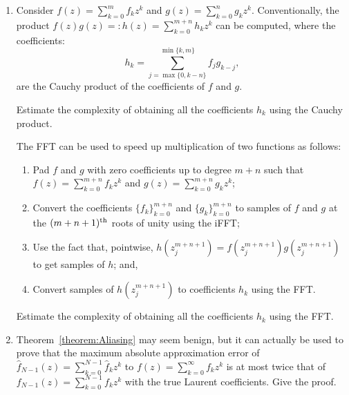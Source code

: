 \begin{enumerate}

\item Consider $\displaystyle f(z) = \sum_{k=0}^m f_k z^k$ and $\displaystyle g(z) = \sum_{k=0}^n g_k z^k$. Conventionally, the product $\displaystyle f(z)g(z) =: h(z) = \sum_{k=0}^{m+n}h_k z^k$ can be computed, where the coefficients:
\[
h_k=\sum_{j=\max\{0,k-n\}}^{\min\{k,m\}} f_j g_{k-j},
\]
are the Cauchy product of the coefficients of $f$ and $g$.

Estimate the complexity of obtaining all the coefficients $h_k$ using the Cauchy product.

The FFT can be used to speed up multiplication of two functions as follows:
\begin{enumerate}
\item Pad $f$ and $g$ with zero coefficients up to degree $m+n$ such that $\displaystyle f(z) = \sum_{k=0}^{m+n} f_k z^k$ and $\displaystyle g(z) = \sum_{k=0}^{m+n} g_k z^k$;
\item Convert the coefficients $\{f_k\}_{k=0}^{m+n}$ and $\{g_k\}_{k=0}^{m+n}$ to samples of $f$ and $g$ at the $(m+n+1)^{\rm th}$ roots of unity using the iFFT;
\item Use the fact that, pointwise, $h(z_j^{m+n+1}) = f(z_j^{m+n+1})g(z_j^{m+n+1})$ to get samples of $h$; and,
\item Convert samples of $h(z_j^{m+n+1})$ to coefficients $h_k$ using the FFT.
\end{enumerate}
Estimate the complexity of obtaining all the coefficients $h_k$ using the FFT.

\item Theorem~\ref{theorem:Aliasing} may seem benign, but it can actually be used to prove that the maximum absolute approximation error of $\displaystyle \hat{f}_{N-1}(z) = \sum_{k=0}^{N-1}\hat{f}_kz^k$ to $\displaystyle f(z) = \sum_{k=0}^\infty f_kz^k$ is at most twice that of $\displaystyle f_{N-1}(z) = \sum_{k=0}^{N-1}f_kz^k$ with the true Laurent coefficients. Give the proof.


\end{enumerate}
